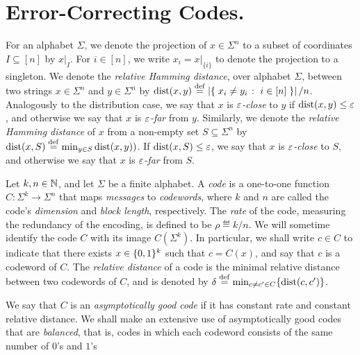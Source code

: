 \section{Error-Correcting Codes.} 

For an alphabet $\Sigma$, we denote the projection of $x \in \Sigma^n$ to a subset of coordinates $I \subseteq [n]$ by $x|_I$. For $i \in [n]$, we write $x_i = x|_{\{i\}}$ to denote the projection to a singleton. We denote the \emph{relative Hamming distance}, over alphabet $\Sigma$, between two strings $x \in \Sigma^n$ and $y \in \Sigma^n$ by $\dist{x}{y} \eqdef \abs{ \setOfSuchThat{ x_i \neq y_i }{ i \in [n] } }/n$.  Analogously to the distribution case, we say that $x$ is \emph{$\varepsilon$-close} to $y$ if $\dist{x}{y} \leq \eps$, and otherwise we say that $x$ is \emph{$\varepsilon$-far} from $y$. Similarly, we denote the \emph{relative Hamming distance} of $x$ from a non-empty set $S \subseteq \Sigma^n$ by $\dist{x}{S} \eqdef \min_{y \in S} \dist{x}{y})$. If $\dist{x}{S} \leq \eps$, we say that $x$ is \emph{$\varepsilon$-close} to $S$, and otherwise we say that $x$ is \emph{$\varepsilon$-far} from $S$.

Let $k,n\in\mathbb{N}$, and let $\Sigma$ be a finite alphabet. A \emph{code} is a one-to-one function $C\colon\Sigma^k \to \Sigma^n$ that maps \emph{messages} to \emph{codewords}, where $k$ and $n$ are called the code's \emph{dimension} and \emph{block length}, respectively. The \emph{rate} of the code, measuring the redundancy of the encoding, is defined to be $\rho \eqdef k/n$. We will sometime identify the code $C$ with its image $C(\Sigma^k)$. In particular, we shall write $c \in C$ to indicate that there exists $x\in\{0,1\}^k$ such that $c = C(x)$, and say that $c$ is a codeword of $C$.  The \emph{relative distance} of a code is the minimal relative distance between two codewords of $C$, and is denoted by $\delta \eqdef \min_{c \neq c' \in C}\{\dist{c}{c'}\}$. 

We say that $C$ is an \emph{asymptotically good code} if it has constant rate and constant relative distance. We shall make an extensive use of asymptotically good codes that are \emph{balanced}, that is, codes in which each codeword consists of the same number of $0$'s and $1$'s


